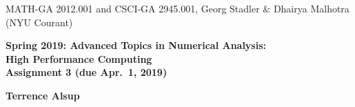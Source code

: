 \documentclass[12pt]{article}
\begin{document}
\begin{center}
  \vspace*{-2cm}
{\small MATH-GA 2012.001 and CSCI-GA 2945.001, Georg Stadler \&
  Dhairya Malhotra (NYU Courant)}
\end{center}
\vspace*{.5cm}


\begin{center}
\large \textbf{%
Spring 2019: Advanced Topics in Numerical Analysis: \\
High Performance Computing \\
Assignment 3 (due Apr.\ 1, 2019) }
\end{center}



\begin{center}
\large \textbf{Terrence Alsup}
\end{center}
\vspace*{.5cm}
\end{document}
